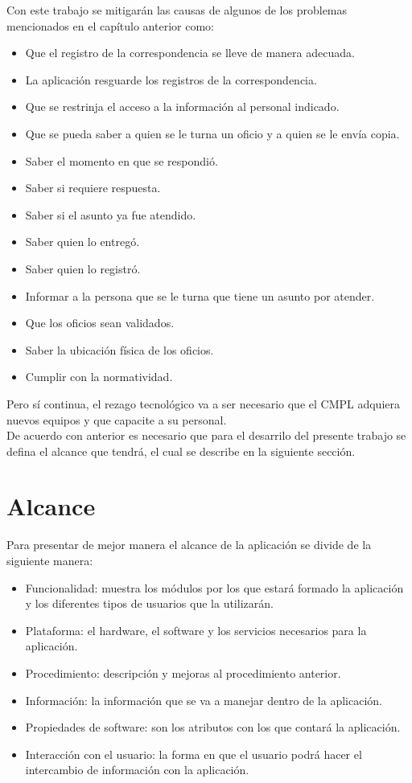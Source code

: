 Con este trabajo se mitigarán las causas de algunos de los problemas mencionados en el capítulo anterior como: 
\begin{itemize}
	\item Que el registro de la correspondencia se lleve de manera adecuada.
	\item La aplicación resguarde los registros de la correspondencia.
	\item Que se restrinja el acceso a la información al personal indicado.
	\item Que se pueda saber a quien se le turna un oficio y a quien se le envía copia.
	\item Saber el momento en que se respondió.
	\item Saber si requiere respuesta.
	\item Saber si el asunto ya fue atendido. 
	\item Saber quien lo entregó.
	\item Saber quien lo registró.
	\item Informar a la persona que se le turna que tiene un asunto por atender.
	\item Que los oficios sean validados.
	\item Saber la ubicación física de los oficios. 
	\item Cumplir con la normatividad.
\end{itemize}  
Pero sí continua, el rezago tecnológico va a ser necesario que el CMPL adquiera nuevos equipos y que capacite a su personal. \\

De acuerdo con anterior es necesario que para el desarrilo del presente trabajo se defina el alcance que tendrá, el cual se describe en la siguiente sección. 

\section{Alcance}

Para presentar de mejor manera el alcance de la aplicación se divide de la siguiente manera: \\

\begin{itemize}
	\item Funcionalidad: muestra los módulos por los que estará formado la aplicación y los diferentes tipos de usuarios que la utilizarán.
	\item Plataforma: el hardware, el software y los servicios necesarios para la aplicación.
	\item Procedimiento: descripción y mejoras al procedimiento anterior.
	\item Información: la información que se va a manejar dentro de la aplicación.
	\item Propiedades de software: son los atributos con los que contará la aplicación.
	\item Interacción con el usuario: la forma en que el usuario podrá hacer el intercambio de información con la aplicación.
\end{itemize}

